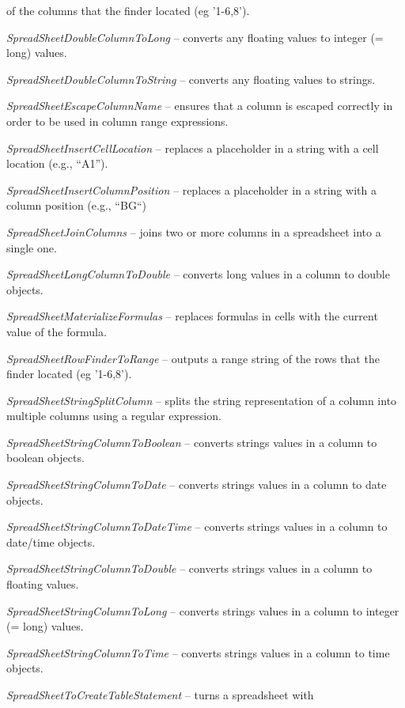 \documentclass[a4paper]{book}
\begin{document}
\begin{tight_itemize}
	of the columns that the finder located (eg '1-6,8').
	\item \textit{SpreadSheetDoubleColumnToLong} -- converts any floating values
	to integer (= long) values.
	\item \textit{SpreadSheetDoubleColumnToString} -- converts any floating values
	to strings.
	\item \textit{SpreadSheetEscapeColumnName} -- ensures that a column is escaped
	correctly in order to be used in column range expressions.
	\item \textit{SpreadSheetInsertCellLocation} -- replaces a placeholder in 
	a string with a cell location (e.g., ``A1'').
	\item \textit{SpreadSheetInsertColumnPosition} -- replaces a placeholder in
	a string with a column position (e.g., ``BG``)
	\item \textit{SpreadSheetJoinColumns} -- joins two or more columns in
	a spreadsheet into a single one.
	\item \textit{SpreadSheetLongColumnToDouble} -- converts long values in a
	column to double objects.
	\item \textit{SpreadSheetMaterializeFormulas} -- replaces formulas in cells
	with the current value of the formula.
	\item \textit{SpreadSheetRowFinderToRange} -- outputs a range string
	of the rows that the finder located (eg '1-6,8').
	\item \textit{SpreadSheetStringSplitColumn} -- splits the string representation 
	of a column into multiple columns using a regular expression.
	\item \textit{SpreadSheetStringColumnToBoolean} -- converts strings values in a 
	column to boolean objects.
	\item \textit{SpreadSheetStringColumnToDate} -- converts strings values in a 
	column to date objects.
	\item \textit{SpreadSheetStringColumnToDateTime} -- converts strings values in a 
	column to date/time objects.
	\item \textit{SpreadSheetStringColumnToDouble} -- converts strings values in a 
	column to floating values.
	\item \textit{SpreadSheetStringColumnToLong} -- converts strings values in a 
	column to integer (= long) values.
	\item \textit{SpreadSheetStringColumnToTime} -- converts strings values in a 
	column to time objects.
	\item \textit{SpreadSheetToCreateTableStatement} -- turns a spreadsheet with

\end{tight_itemize}
\end{document}

